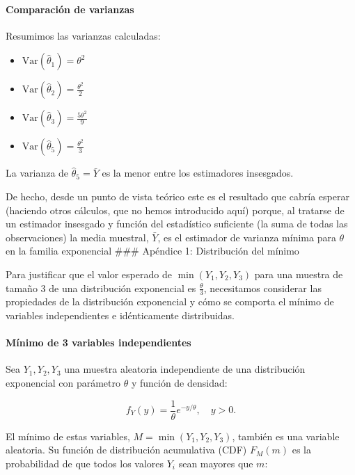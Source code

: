 \documentclass[
]{article}
\providecommand{\tightlist}{%
  \setlength{\itemsep}{0pt}\setlength{\parskip}{0pt}}
\begin{document}
\paragraph{Comparación de varianzas}\label{comparaciuxf3n-de-varianzas-1}

Resumimos las varianzas calculadas:

\begin{itemize}
\tightlist
\item
  \(\text{Var}(\hat{\theta}_1) = \theta^2\)
\item
  \(\text{Var}(\hat{\theta}_2) = \frac{\theta^2}{2}\)
\item
  \(\text{Var}(\hat{\theta}_3) = \frac{5\theta^2}{9}\)
\item
  \(\text{Var}(\hat{\theta}_5) = \frac{\theta^2}{3}\)
\end{itemize}

La varianza de \(\hat{\theta}_5 = \bar{Y}\) es la menor entre los estimadores insesgados.

De hecho, desde un punto de vista teórico este es el resultado que cabría esperar (haciendo otros cálculos, que no hemos introducido aquí) porque, al tratarse de un estimador insesgado y función del estadístico suficiente (la suma de todas las observaciones) la media muestral, \(\bar{Y}\), es el estimador de varianza mínima para \(\theta\) en la familia exponencial
\#\#\# Apéndice 1: Distribución del mínimo

Para justificar que el valor esperado de \(\min(Y_1, Y_2, Y_3)\) para una muestra de tamaño 3 de una distribución exponencial es \(\frac{\theta}{3}\), necesitamos considerar las propiedades de la distribución exponencial y cómo se comporta el mínimo de variables independientes e idénticamente distribuidas.

\paragraph{Mínimo de 3 variables independientes}\label{muxednimo-de-3-variables-independientes}

Sea \(Y_1, Y_2, Y_3\) una muestra aleatoria independiente de una distribución exponencial con parámetro \(\theta\) y función de densidad:

\[
f_Y(y) = \frac{1}{\theta} e^{-y/\theta}, \quad y > 0.
\]

El mínimo de estas variables, \(M = \min(Y_1, Y_2, Y_3)\), también es una variable aleatoria. Su función de distribución acumulativa (CDF) \(F_M(m)\) es la probabilidad de que todos los valores \(Y_i\) sean mayores que \(m\):
\end{document}
